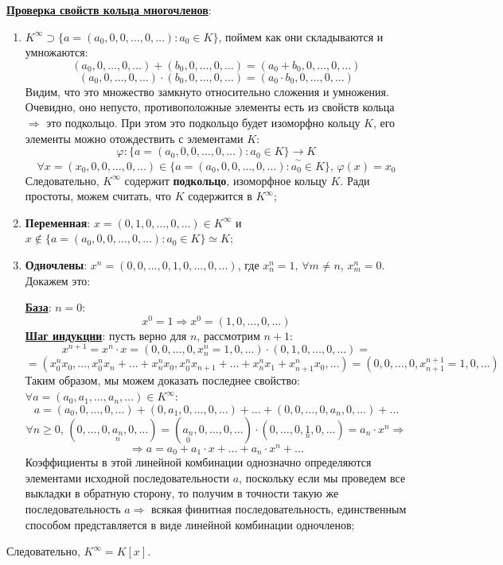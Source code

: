 \documentclass[12pt]{article}
\theoremstyle{definition}
\begin{document}
\textbf{\uline{Проверка свойств кольца многочленов}}:
\begin{enumerate}[label=\arabic*)]
	\item $K^{\infty} \supset \{a = (a_0, 0, 0, \dotsc, 0, \dotsc) \colon a_0 \in K\}$, поймем как они складываются и умножаются:
	$$
		(a_0, 0, \dotsc, 0, \dotsc ) + (b_0, 0, \dotsc, 0, \dotsc ) = (a_0 + b_0, 0,\dotsc, 0, \dotsc )
	$$
	$$
		(a_0, 0, \dotsc, 0, \dotsc ){\cdot}(b_0, 0, \dotsc, 0, \dotsc ) = (a_0{\cdot}b_0, 0, \dotsc, 0,\dotsc)
	$$
	Видим, что это множество замкнуто относительно сложения и умножения. Очевидно, оно непусто, противоположные элементы есть из свойств кольца $\Rightarrow$ это подкольцо. При этом это подкольцо будет изоморфно кольцу $K$, его элементы можно отождествить с элементами $K$:
	$$
		\varphi\colon \{a = (a_0, 0, 0, \dotsc, 0, \dotsc) \colon a_0 \in K\} \xrightarrow[\sim]{} K 
	$$
	$$
		\forall x = (x_0, 0, 0, \dotsc, 0, \dotsc) \in \{a = (a_0, 0, 0, \dotsc, 0, \dotsc) \colon a_0 \in K\}, \, \varphi(x) = x_0
	$$
	Следовательно, $K^{\infty}$ содержит \textbf{подкольцо}, изоморфное кольцу $K$. Ради простоты, можем считать, что $K$ содержится в $K^{\infty}$;
	\item \textbf{Переменная}: $x = (0,1,0, \dotsc, 0, \dotsc) \in K^{\infty}$ и $x \not\in \{a = (a_0, 0, 0, \dotsc, 0, \dotsc) \colon a_0 \in K\}\simeq K$;
	\newpage
	\item \textbf{Одночлены}: $x^n = (0, 0,\dotsc, 0, 1,0,\dotsc, 0, \dotsc)$, где $x^n_n = 1, \, \forall m \neq n, \, x^n_m = 0$. Докажем это:
	
	\textbf{\uline{База}}: $n = 0$:
	$$
		x^0 = 1 \Rightarrow x^0 = (1,0,\dotsc, 0, \dotsc)
	$$
	\textbf{\uline{Шаг индукции}}: пусть верно для $n$, рассмотрим $n+1$:
	$$
		x^{n+1}	= x^n{\cdot}x = (0, 0, \dotsc, 0, x^n_n = 1, 0, \dotsc){\cdot}(0,1,0,\dotsc,0,\dotsc) =
	$$
	$$
		= (x^n_0x_0, \dotsc, x^n_0x_n + \dotsc + x^n_nx_0, x^n_0x_{n+1} + \dotsc + x^n_{n}x_1 + x^n_{n+1}x_0, \dotsc) = (0, 0, \dotsc, 0, x^{n+1}_{n+1} = 1, 0, \dotsc )
	$$
	Таким образом, мы можем доказать последнее свойство: $\forall a = (a_0, a_1,\dotsc, a_n, \dotsc) \in K^{\infty}$:
	$$
		a = (a_0, 0, \dotsc, 0, \dotsc) + (0,a_1,0,\dotsc, 0, \dotsc) + \dotsc + (0,0,\dotsc, 0,a_n,0, \dotsc) + \dotsc
	$$ 
	$$
		\forall n \geq 0, \, (0, \dotsc, 0,\underset{n}{a_n},0, \dotsc ) = (\underset{0}{a_n}, 0, \dotsc, 0, \dotsc){\cdot}(0, \dotsc, 0,\underset{n}{1},0, \dotsc) = a_n{\cdot}x^n \Rightarrow
	$$
	$$
		\Rightarrow a = a_0 + a_1{\cdot}x + \dotsc + a_n{\cdot}x^n + \dotsc
	$$
	Коэффициенты в этой линейной комбинации однозначно определяются элементами исходной последовательности $a$, поскольку если мы проведем все выкладки в обратную сторону, то получим в точности такую же последовательность $a \Rightarrow$ всякая финитная последовательность, единственным способом представляется в виде линейной комбинации одночленов;
\end{enumerate}
Следовательно, $K^{\infty} = K[x]$.
\end{document}
